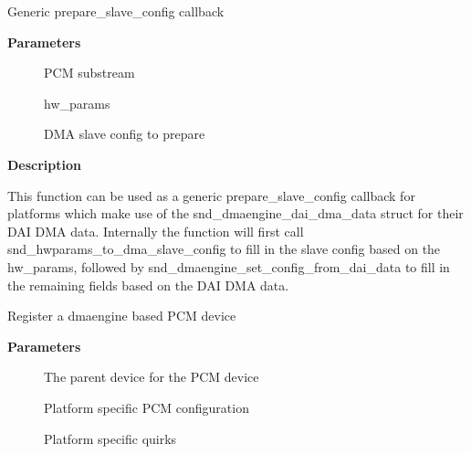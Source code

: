\documentclass[a4paper,8pt,english]{sphinxmanual}
\begin{document}
\begin{fulllineitems}
\label{sound/kernel-api/alsa-driver-api:c.snd_dmaengine_pcm_prepare_slave_config}
Generic prepare\_slave\_config callback

\end{fulllineitems}


\textbf{Parameters}
\begin{description}
\item[{}] \leavevmode
PCM substream

\item[{}] \leavevmode
hw\_params

\item[{}] \leavevmode
DMA slave config to prepare

\end{description}

\textbf{Description}

This function can be used as a generic prepare\_slave\_config callback for
platforms which make use of the snd\_dmaengine\_dai\_dma\_data struct for their
DAI DMA data. Internally the function will first call
snd\_hwparams\_to\_dma\_slave\_config to fill in the slave config based on the
hw\_params, followed by snd\_dmaengine\_set\_config\_from\_dai\_data to fill in the
remaining fields based on the DAI DMA data.

\begin{fulllineitems}
\label{sound/kernel-api/alsa-driver-api:c.snd_dmaengine_pcm_register}
Register a dmaengine based PCM device

\end{fulllineitems}


\textbf{Parameters}
\begin{description}
\item[{}] \leavevmode
The parent device for the PCM device

\item[{}] \leavevmode
Platform specific PCM configuration

\item[{}] \leavevmode
Platform specific quirks

\end{description}
\end{document}
